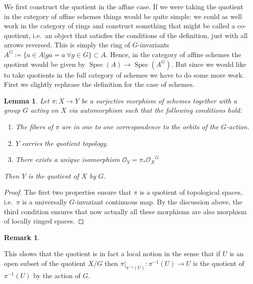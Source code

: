 \documentclass[11pt, a4paper, english, twoside]{article}
\theoremstyle{plain}
\newtheorem{lemma}[theorem]{Lemma}
\theoremstyle{definition}
\newtheorem{remark}[theorem]{Remark}
\DeclareMathOperator{\Spec}{Spec}
\begin{document}
We first construct the quotient in the affine case. If we were taking the quotient in the category of affine schemes things would be
quite simple: we could as well work in the category of rings and construct something that might be called a co-quotient, i.e.\ an object that
satisfies the conditions of the definition, just with all arrows reversed. This is simply the ring of $G$-invariants
$A^G \coloneqq \{a \in A | ga = a \ \forall g \in G\} \subset A$. Hence, in the category of affine schemes the quotient would be given by 
$\Spec(A) \to \Spec(A^G)$. But since we would like to take quotients in the full category of schemes we have to do some more work.
First we slightly rephrase the definition for the case of schemes.
\begin{lemma}
    \label{quotProps}
    Let $\pi \colon X \to Y$ be a surjective morphism of schemes together with a group $G$ acting on $X$ via automorphism 
    such that the following conditions hold:
    \begin{enumerate}[label=\rm{\roman*)}]
        \item The fibers of $\pi$ are in one to one correspondence to the orbits of the $G$-action.
        \item $Y$ carries the quotient topology.
        \item There exists a unique isomorphism $\mathcal{O}_Y = {\pi_*\mathcal{O}_X}^G$
    \end{enumerate}
    Then $Y$ is the quotient of $X$ by $G$.
\end{lemma}
\begin{proof}
    The first two properties ensure that $\pi$ is a quotient of topological spaces, i.e.\ $\pi$ is a universally $G$-invariant continuous map.
    By the discussion above, the third condition ensures that now actually all these morphisms are also morphism of locally ringed spaces.
\end{proof}

\begin{remark}
    \label{quotLocal}
    \begin{sloppypar}
    This shows that the quotient is in fact a local notion in the sense that if $U$ is an open subset of the quotient $X/G$ 
    then ${\pi|_{\pi^{-1}(U)} \colon \pi^{-1}(U) \to U}$ is the quotient of $\pi^{-1}(U)$ by the action of $G$.
\end{sloppypar}
\end{remark}
\end{document}
